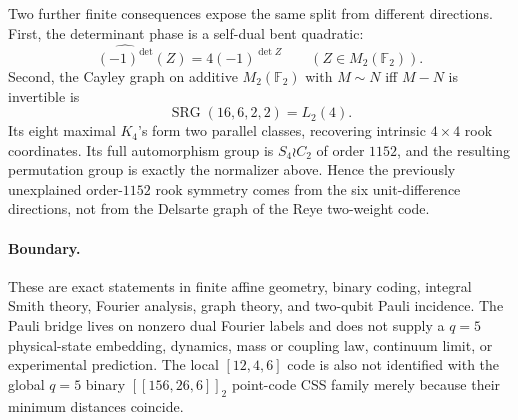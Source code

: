 Two further finite consequences expose the same split from different directions.
First, the determinant phase is a self-dual bent quadratic:
\[
\boxed{\widehat{(-1)^{\det}}(Z)=4(-1)^{\det Z}}
\qquad (Z\in M_2(\mathbb F_2)).
\]
Second, the Cayley graph on additive $M_2(\mathbb F_2)$ with
$M\sim N$ iff $M-N$ is invertible is
\[
\operatorname{SRG}(16,6,2,2)=L_2(4).
\]
Its eight maximal $K_4$'s form two parallel classes, recovering intrinsic
$4\times4$ rook coordinates.  Its full automorphism group is
$S_4\wr C_2$ of order $1152$, and the resulting permutation group is exactly
the normalizer above.  Hence the previously unexplained order-$1152$ rook
symmetry comes from the six unit-difference directions, not from the Delsarte
graph of the Reye two-weight code.

\paragraph{Boundary.}
These are exact statements in finite affine geometry, binary coding, integral
Smith theory, Fourier analysis, graph theory, and two-qubit Pauli incidence.
The Pauli bridge lives on nonzero dual Fourier labels and does not supply a
$q=5$ physical-state embedding, dynamics, mass or coupling law, continuum limit,
or experimental prediction.  The local $[12,4,6]$ code is also not identified
with the global $q=5$ binary $[[156,26,6]]_2$ point-code CSS family merely because
their minimum distances coincide.

